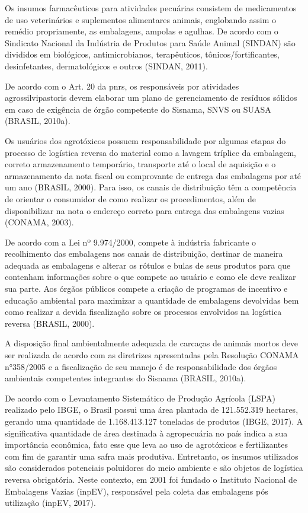 	Os insumos farmacêuticos para atividades pecuárias consistem de medicamentos de uso veterinários e suplementos alimentares animais, englobando assim o remédio propriamente, as embalagens, ampolas e agulhas. De acordo com o Sindicato Nacional da Indústria de Produtos para Saúde Animal (SINDAN) são divididos em biológicos, antimicrobianos, terapêuticos, tônicos/fortificantes, desinfetantes, dermatológicos e outros (SINDAN, 2011).
	
	De acordo com o Art. 20 da \gls{pnrs}, os responsáveis por atividades agrossilvipastoris devem elaborar um plano de gerenciamento de resíduos sólidos em caso de exigência de órgão competente do Sisnama, SNVS ou SUASA (BRASIL, 2010a).
	
	Os usuários dos agrotóxicos possuem responsabilidade por algumas etapas do processo de logística reversa do material como a lavagem tríplice da embalagem, correto armazenamento temporário, transporte até o local de aquisição e o armazenamento da nota fiscal ou comprovante de entrega das embalagens por até um ano (BRASIL, 2000). Para isso, os canais de distribuição têm a competência de orientar o consumidor de como realizar os procedimentos, além de disponibilizar na nota o endereço correto para entrega das embalagens vazias (CONAMA, 2003).
	
	De acordo com a Lei nº 9.974/2000, compete à indústria fabricante o recolhimento das embalagens nos canais de distribuição, destinar de maneira adequada as embalagens e alterar os rótulos e bulas de seus produtos para que contenham informações sobre o que compete ao usuário e como ele deve realizar sua parte. Aos órgãos públicos compete a criação de programas de incentivo e educação ambiental para maximizar a quantidade de embalagens devolvidas bem como realizar a devida fiscalização sobre os processos envolvidos na logística reversa (BRASIL, 2000).
	
	A disposição final ambientalmente adequada de carcaças de animais mortos deve ser realizada de acordo com as diretrizes apresentadas pela Resolução CONAMA n°358/2005 e a fiscalização de seu manejo é de responsabilidade dos órgãos ambientais competentes integrantes do Sisnama (BRASIL, 2010a).
	
	De acordo com o Levantamento Sistemático de Produção Agrícola (LSPA) realizado pelo IBGE, o Brasil possui uma área plantada de 121.552.319 hectares, gerando uma quantidade de 1.168.413.127 toneladas de produtos (IBGE, 2017). A significativa quantidade de área destinada à agropecuária no país indica a sua importância econômica, fato esse que leva ao uso de agrotóxicos e fertilizantes com fim de garantir uma safra mais produtiva. Entretanto, os insumos utilizados são considerados potenciais poluidores do meio ambiente e são objetos de logística reversa obrigatória. Neste contexto, em 2001 foi fundado o Instituto Nacional de Embalagens Vazias (inpEV), responsável pela coleta das embalagens pós utilização (inpEV, 2017).
	
